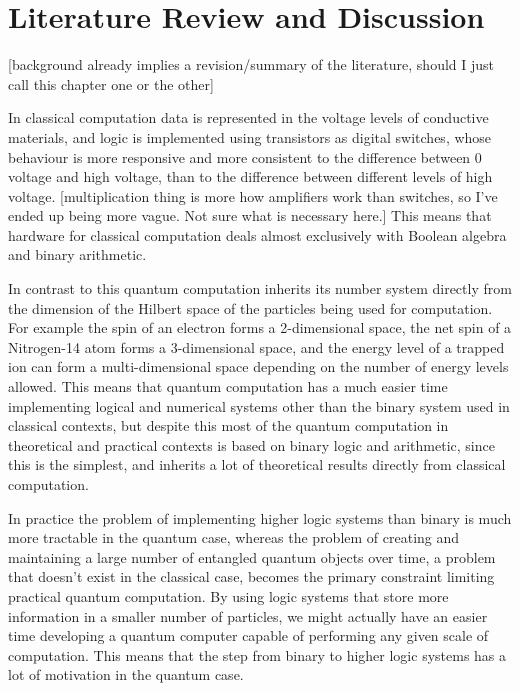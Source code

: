 
\chapter[LITERATURE REVIEW AND DISCUSSION]{Literature Review and Discussion}
[background already implies a revision/summary of the literature, should I just call this chapter one or the other]

In classical computation data is represented in the voltage levels of conductive materials, and logic is implemented using transistors as digital switches, whose behaviour is more responsive and more consistent to the difference between 0 voltage and high voltage, than to the difference between different levels of high voltage. [multiplication thing is more how amplifiers work than switches, so I've ended up being more vague. Not sure what is necessary here.] This means that hardware for classical computation deals almost exclusively with Boolean algebra and binary arithmetic.

In contrast to this quantum computation inherits its number system directly from the dimension of the Hilbert space of the particles being used for computation. For example the spin of an electron forms a 2-dimensional space, the net spin of a Nitrogen-14 atom forms a 3-dimensional space, and the energy level of a trapped ion can form a multi-dimensional space depending on the number of energy levels allowed. This means that quantum computation has a much easier time implementing logical and numerical systems other than the binary system used in classical contexts, but despite this most of the quantum computation in theoretical and practical contexts is based on binary logic and arithmetic, since this is the simplest, and inherits a lot of theoretical results directly from classical computation.

In practice the problem of implementing higher logic systems than binary is much more tractable in the quantum case, whereas the problem of creating and maintaining a large number of entangled quantum objects over time, a problem that doesn't exist in the classical case, becomes the primary constraint limiting practical quantum computation. By using logic systems that store more information in a smaller number of particles, we might actually have an easier time developing a quantum computer capable of performing any given scale of computation. This means that the step from binary to higher logic systems has a lot of motivation in the quantum case.

